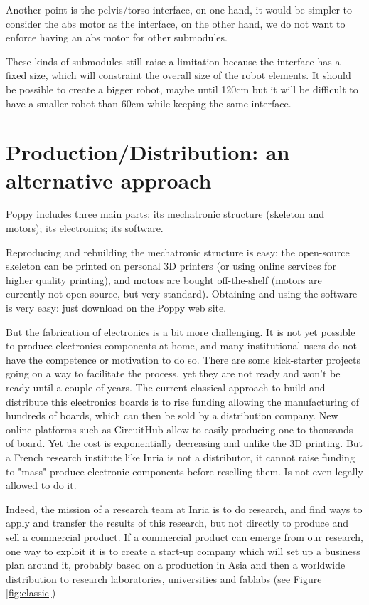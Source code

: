Another point is the pelvis/torso interface, on one hand, it would be simpler to consider the abs motor as the interface, on the other hand, we do not want to enforce having an abs motor for other submodules.

These kinds of submodules still raise a limitation because the interface has a fixed size, which will constraint the overall size of the robot elements. It should be possible to create a bigger robot, maybe until 120cm but it will be difficult to have a smaller robot than 60cm while keeping the same interface.



\section{Production/Distribution: an alternative approach} %

Poppy includes three main parts: its mechatronic structure (skeleton and motors); its electronics; its software.

Reproducing and rebuilding the mechatronic structure is easy: the open-source skeleton can be printed on personal 3D printers (or using online services for higher quality printing), and motors are bought off-the-shelf (motors are currently not open-source, but very standard). Obtaining and using the software is very easy: just download on the Poppy web site.

But the fabrication of electronics is a bit more challenging. It is not yet possible to produce electronics components at home, and many institutional users do not have the competence or motivation to do so. There are some kick-starter projects going on a way to facilitate the process, yet they are not ready and won't be ready until a couple of years. The current classical approach to build and distribute this electronics boards is to rise funding allowing the manufacturing of hundreds of boards, which can then be sold by a distribution company. New online platforms such as CircuitHub allow to easily producing one to thousands of board. Yet the cost is exponentially decreasing and unlike the 3D printing. But a French research institute like Inria is not a distributor, it cannot raise funding to "mass" produce electronic components before reselling them. Is not even legally allowed to do it.

Indeed, the mission of a research team at Inria is to do research, and find ways to apply and transfer the results of this research, but not directly to produce and sell a commercial product. If a commercial product can emerge from our research, one way to exploit it is to create a start-up company which will set up a business plan around it, probably based on a production in Asia and then a worldwide distribution to research laboratories, universities and fablabs (see Figure \ref{fig:classic})

